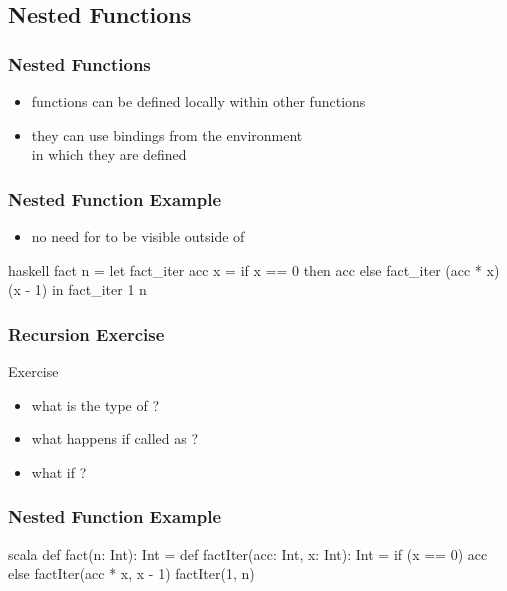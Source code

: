 \documentclass[dvipsnames]{beamer}
\theoremstyle{plain}
\begin{document}
\subsection{Nested Functions}

\begin{frame}
  \frametitle{Nested Functions}

  \begin{itemize}
    \item functions can be defined locally within other functions
    \item they can use bindings from the environment\\
      in which they are defined
  \end{itemize}
\end{frame}

\begin{frame}[fragile]
  \frametitle{Nested Function Example}

  \begin{example}[factorial]
    \begin{itemize}
      \item no need for  to be visible
        outside of 
    \end{itemize}

    \begin{pygments}{haskell}
fact n =
    let
        fact_iter acc x =
            if x == 0
            then acc
            else fact_iter (acc * x) (x - 1)
    in
        fact_iter 1 n
    \end{pygments}
  \end{example}
\end{frame}

\begin{frame}[fragile]
  \frametitle{Recursion Exercise}

  \begin{block}{Exercise}
    \begin{itemize}
      \item what is the type of ?
      \item what happens if called as ?
      \item what if ?
    \end{itemize}
  \end{block}
\end{frame}

\begin{frame}[fragile]
  \frametitle{Nested Function Example}

  \begin{example}
    \begin{pygments}{scala}
def fact(n: Int): Int = {
    def factIter(acc: Int, x: Int): Int =
        if (x == 0) acc
        else factIter(acc * x, x - 1)
    factIter(1, n)
}
    \end{pygments}
  \end{example}
\end{frame}
\end{document}
